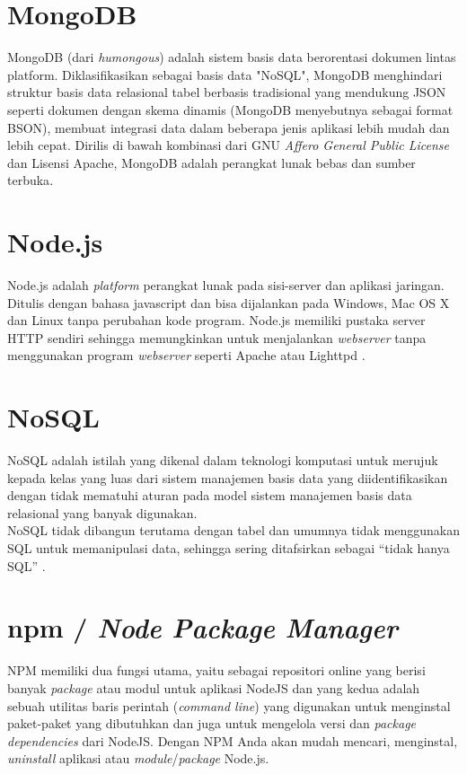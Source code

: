 	
	\section{  MongoDB}
	MongoDB (dari \textit{humongous}) adalah sistem basis data berorentasi dokumen lintas platform. Diklasifikasikan sebagai basis data "NoSQL", MongoDB menghindari struktur basis data relasional tabel berbasis tradisional yang mendukung JSON seperti dokumen dengan skema dinamis (MongoDB menyebutnya sebagai format BSON), membuat integrasi data dalam beberapa jenis aplikasi lebih mudah dan lebih cepat. Dirilis di bawah kombinasi dari GNU \textit{Affero General Public License }dan Lisensi Apache, MongoDB adalah perangkat lunak bebas dan sumber terbuka\cite{noauthor_mongodb_2017}.
	    
	\section{Node.js}
	Node.js adalah \textit{platform} perangkat lunak pada sisi-server dan aplikasi jaringan. Ditulis dengan bahasa javascript dan bisa dijalankan pada Windows, Mac OS X dan Linux tanpa perubahan kode program. Node.js memiliki pustaka server HTTP sendiri sehingga memungkinkan untuk menjalankan \textit{webserver} tanpa menggunakan program \textit{webserver} seperti Apache atau Lighttpd \cite{noauthor_node.js_2014}.
	    
	\section{NoSQL}
	NoSQL adalah istilah yang dikenal dalam teknologi komputasi untuk merujuk kepada kelas yang luas dari sistem manajemen basis data yang diidentifikasikan dengan tidak mematuhi aturan pada model sistem manajemen basis data relasional yang banyak digunakan.
	\\ \indent
	NoSQL tidak dibangun terutama dengan tabel dan umumnya tidak menggunakan SQL untuk memanipulasi data, sehingga sering ditafsirkan sebagai “tidak hanya SQL” \cite{wikipedia_nosql_nodate}.

	\section{  npm / \textit{Node Package Manager}}
	NPM memiliki dua fungsi utama, yaitu sebagai repositori online yang berisi banyak \textit{package} atau modul untuk aplikasi NodeJS dan yang kedua adalah sebuah utilitas baris perintah (\textit{command line}) yang digunakan untuk menginstal paket-paket yang dibutuhkan dan juga untuk mengelola versi dan \textit{package dependencies} dari NodeJS. Dengan NPM Anda akan mudah mencari, menginstal, \textit{uninstall} aplikasi atau \textit{module}/\textit{package }Node.js\cite{azurri_node_2016}.
	

